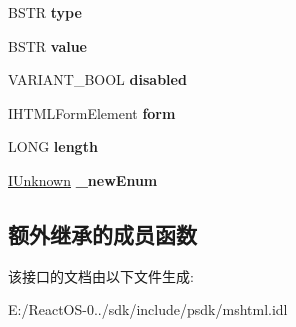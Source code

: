 \begin{DoxyCompactItemize}
B\+S\+TR {\bfseries type}
\item 
\mbox{\label{interface_m_s_h_t_m_l_1_1_i_h_t_m_l_select_element_ac9e8cf42951acaf0c0860d861a3c131f}} 
B\+S\+TR {\bfseries value}
\item 
\mbox{\label{interface_m_s_h_t_m_l_1_1_i_h_t_m_l_select_element_adb5a56c22e5e684134d873402c75fde4}} 
V\+A\+R\+I\+A\+N\+T\+\_\+\+B\+O\+OL {\bfseries disabled}
\item 
\mbox{\label{interface_m_s_h_t_m_l_1_1_i_h_t_m_l_select_element_a62d632a1fe3bcbafecf09c167c45b406}} 
I\+H\+T\+M\+L\+Form\+Element {\bfseries form}
\item 
\mbox{\label{interface_m_s_h_t_m_l_1_1_i_h_t_m_l_select_element_aebdf6fa33fd65d5eaa4b03eb8bf18c96}} 
L\+O\+NG {\bfseries length}
\item 
\mbox{\label{interface_m_s_h_t_m_l_1_1_i_h_t_m_l_select_element_aa2ef027c2d3d4ecc2e7f5c6f2106fd2e}} 
\hyperlink{interface_i_unknown}{I\+Unknown} {\bfseries \+\_\+new\+Enum}
\end{DoxyCompactItemize}
\subsection*{额外继承的成员函数}


该接口的文档由以下文件生成\+:\begin{DoxyCompactItemize}
\item 
E\+:/\+React\+O\+S-\/0../sdk/include/psdk/mshtml.\+idl\end{DoxyCompactItemize}
